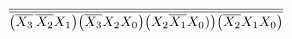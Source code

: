 \documentclass[preview]{standalone}
\begin{document}
\begin{align*}
\overline{\overline{\left(\overline{X_3}\nobreak\hspace{.16667em plus .08333em}\overline{X_2}X_1\right)}\overline{\left(\overline{X_3}X_2X_0\right)}\overline{\left(X_2\overline{X_1}X_0)\right)}\overline{\left(\overline{X_2}X_1X_0\right)}}
\end{align*}
\end{document}
